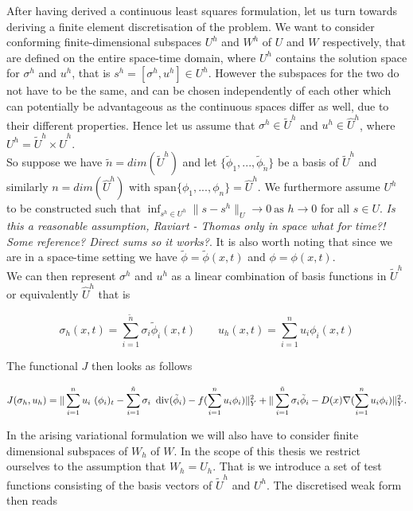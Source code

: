 \documentclass[../draft_1.tex]{subfiles}
\begin{document}
After having derived a continuous least squares formulation, let us turn towards deriving a finite element discretisation of the problem. We want to consider conforming finite-dimensional subspaces $U^h$ and $W^h$ of $U$ and $W$ respectively, that are defined on the entire space-time domain, where $U^h$ contains the solution space for $\sigma^h$ and $u^h$, that is $s^h = [\sigma^h, u^h] \in U^h$. However the subspaces for the two do not have to be the same, and can be chosen independently of each other which can potentially be advantageous as the continuous spaces differ as well, due to their different properties. Hence let us assume that $\sigma^h \in \tilde{U}^h$ and $u^h \in \hat{U}^h$, where $ U^h = \tilde{U}^h \times \hat{U}^h$. 
\smallskip
\\ 
So suppose we have $\tilde{n} = dim(\tilde{U}^h)$ and let $ \{\tilde{\phi}_1, ..., \tilde{\phi}_{\tilde{n}}\} $ be a basis of $\tilde{U}^h$ and similarly $n = dim(\hat{U}^h)$ with $\text{span} \{\phi_1, ..., \phi_n\}  = \hat{U}^h$. We furthermore assume $U^h$ to be constructed such that $\inf_{s^h \in U^h} \| s - s^h\|_U \rightarrow 0 \ \text{as } h \rightarrow 0$ for all $s \in U$. \textit{Is this a reasonable assumption, Raviart - Thomas only in space what for time?! Some reference? Direct sums so it works?}. It is also worth noting that since we are in a space-time setting we have $\tilde{\phi} = \tilde{\phi}(x,t)$ and  $\phi = \phi(x,t)$.
\smallskip
\\ 
We can then represent $\sigma^h$ and $u^h$ as a linear combination of basis functions in $\tilde{U}^h$ or equivalently $\hat{U}^h$ that is
\begin{ceqn}
	\begin{equation}
 	\sigma_h(x,t) = \sum_{i = 1}^{\tilde{n}} \sigma_i \tilde{\phi}_i(x,t) \qquad 
	u_h(x,t) = \sum_{i = 1}^{n} u_i \phi_i(x,t) 
	\end{equation}
\end{ceqn}
The functional $J$ then looks as follows 
\begin{ceqn}
	\begin{equation}
J(\sigma_h, u_h) =\| \sum_{i=1}^{n} u_i \ (\phi_i)_t - \sum_{i=1}^{\tilde{n}} \sigma_i \ \mathop{}\!\mathrm{div}(\tilde{\phi}_i) - f(\sum_{i=1}^{n} u_i \phi_i) \|_Y^2 + \| \sum_{i=1}^{\tilde{n}} \sigma_i \tilde{\phi}_i - D(x) \nabla (\sum_{i=1}^{n} u_i \phi_i) \| _Y^2.
	\end{equation}
\end{ceqn}

In the arising variational formulation we will also have to consider finite dimensional subspaces of $W_h$ of $W$. In the scope of this thesis we restrict ourselves to the assumption that $W_h = U_h$. That is we introduce a set of test functions consisting of the basis vectors of $\tilde{U}^h$ and $U^h$. The discretised weak form then reads 
\end{document}
